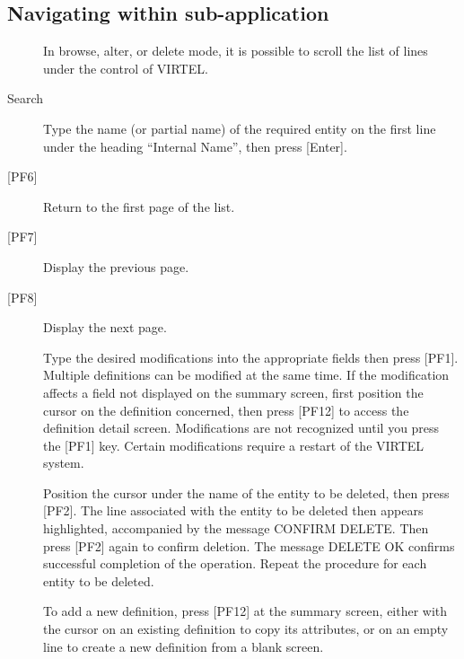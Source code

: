 \documentclass[letterpaper,10pt,english]{sphinxmanual}
\begin{document}
\subsection{Navigating within sub-application}
\label{\detokenize{connectivity_guide:navigating-within-sub-application}}\begin{description}
\item[{}] \leavevmode
In browse, alter, or delete mode, it is possible to scroll the list of lines under the control of VIRTEL.

\item[{Search}] \leavevmode
Type the name (or partial name) of the required entity on the first
line under the heading “Internal Name”, then press {[}Enter{]}.

\item[{{[}PF6{]}}] \leavevmode
Return to the first page of the list.

\item[{{[}PF7{]}}] \leavevmode
Display the previous page.

\item[{{[}PF8{]}}] \leavevmode
Display the next page.

\item[{}] \leavevmode
Type the desired modifications into the appropriate fields then press {[}PF1{]}. Multiple definitions can be modified at the same time. If the modification affects a field not displayed on the summary screen, first position the cursor on the definition concerned, then press {[}PF12{]} to access the definition detail screen. Modifications are not recognized until you press the {[}PF1{]} key. Certain modifications require a restart of the VIRTEL system.

\item[{}] \leavevmode
Position the cursor under the name of the entity to be deleted, then press {[}PF2{]}. The line associated with the entity to be deleted then appears highlighted, accompanied by the message CONFIRM DELETE. Then press {[}PF2{]} again to confirm deletion. The message DELETE OK confirms successful completion of the operation. Repeat the procedure for each entity to be deleted.

\item[{}] \leavevmode
To add a new definition, press {[}PF12{]} at the summary screen, either with the cursor on an existing definition to copy its attributes, or on an empty line to create a new definition from a blank screen.

\end{description}
\end{document}

